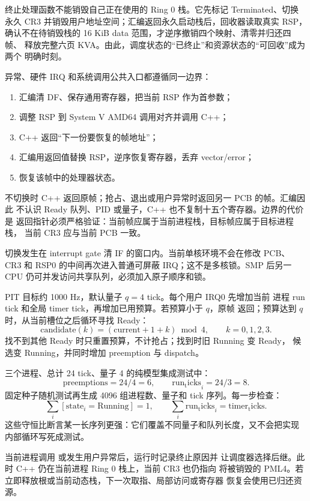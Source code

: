 终止处理函数不能销毁自己正在使用的 Ring 0 栈。它先标记 Terminated、切换
永久 CR3 并销毁用户地址空间；汇编返回永久启动栈后，回收器读取真实 RSP，
确认不在待销毁栈的 16 KiB data 范围，才逆序撤销四个映射、清零并归还四帧、
释放完整六页 KVA。由此，调度状态的“已终止”和资源状态的“可回收”成为两个
明确时刻。

异常、硬件 IRQ 和系统调用公共入口都遵循同一边界：

\begin{enumerate}[label=\arabic*.]
  \item 汇编清 DF、保存通用寄存器，把当前 RSP 作为首参数；
  \item 调整 RSP 到 System V AMD64 调用对齐并调用 C++；
  \item C++ 返回“下一份要恢复的帧地址”；
  \item 汇编用返回值替换 RSP，逆序恢复寄存器，丢弃 vector/error；
  \item {} 恢复该帧中的处理器状态。
\end{enumerate}

不切换时 C++ 返回原帧；抢占、退出或用户异常时返回另一 PCB 的帧。汇编因此
不认识 Ready 队列、PID 或量子，C++ 也不复制十五个寄存器。边界的代价是
返回指针必须严格验证：当前帧应属于当前进程栈，目标帧应属于目标进程栈，
当前 CR3 应与当前 PCB 一致。

切换发生在 interrupt gate 清 IF 的窗口内。当前单核环境不会在修改 PCB、
CR3 和 RSP0 的中间再次进入普通可屏蔽 IRQ；这不是多核锁。SMP 后另一 CPU
仍可并发访问共享队列，必须加入原子顺序和锁。

PIT 目标约 1000 Hz，默认量子 \(q=4\) tick。每个用户 IRQ0 先增加当前
进程 run tick 和全局 timer tick，再增加已用预算。若预算小于 \(q\)，原帧
返回；预算达到 \(q\) 时，从当前槽位之后循环寻找 Ready：
\[
  \mathrm{candidate}(k) =
  (\mathrm{current}+1+k)\bmod 4,\qquad k=0,1,2,3.
\]
找不到其他 Ready 时只重置预算，不计抢占；找到时旧 Running 变 Ready，
候选变 Running，并同时增加 preemption 与 dispatch。

三个进程、总计 24 tick、量子 4 的纯模型集成测试中：
\[
  \mathrm{preemptions}=24/4=6,\qquad
  \mathrm{run_ticks}_i=24/3=8.
\]
固定种子随机测试再生成 4096 组进程数、量子和 tick 序列。每一步检查：
\[
  \sum_i [\mathrm{state}_i=\mathrm{Running}] = 1,\qquad
  \sum_i \mathrm{run_ticks}_i = \mathrm{timer_ticks}.
\]
这些守恒比断言某一长序列更强：它们覆盖不同量子和队列长度，又不会把实现
内部循环写死成测试。

当前进程调用  或发生用户异常后，运行时记录终止原因并
让调度器选择后继。此时 C++ 仍在当前进程 Ring 0 栈上，当前 CR3 也仍指向
将被销毁的 PML4。若立即释放根或当前动态栈，下一次取指、局部访问或寄存器
恢复会使用已归还资源。

